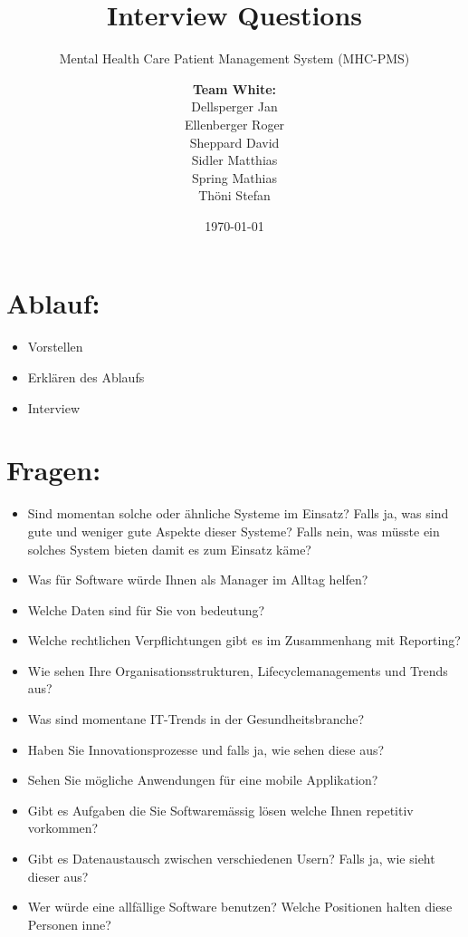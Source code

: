 \documentclass[a4paper]{scrartcl}
\title{Interview Questions}
\subtitle{Mental Health Care Patient Management System (MHC-PMS)}
\author{
\begin{tabular}{l}
\normalfont\bfseries{Team White:}\\
Dellsperger Jan\\
Ellenberger Roger\\
Sheppard David\\
Sidler Matthias\\
Spring Mathias\\
Thöni Stefan
\end{tabular}
}
\date{\today}
\begin{document}
\begin{titlepage}
	\maketitle
\end{titlepage}

\section{Ablauf:}
\begin{itemize}
\item Vorstellen
\item Erklären des Ablaufs
\item Interview
\end{itemize}

\section{Fragen:}
\begin{itemize}
\item Sind momentan solche oder ähnliche Systeme im Einsatz? Falls ja, was sind gute und weniger gute Aspekte dieser Systeme? Falls nein, was müsste ein solches System bieten damit es zum Einsatz käme?
\item Was für Software würde Ihnen als Manager im Alltag helfen?
\item Welche Daten sind für Sie von bedeutung?
\item Welche rechtlichen Verpflichtungen gibt es im Zusammenhang mit Reporting?
\item Wie sehen Ihre Organisationsstrukturen, Lifecyclemanagements und Trends aus?
\item Was sind momentane IT-Trends in der Gesundheitsbranche?
\item Haben Sie Innovationsprozesse und falls ja, wie sehen diese aus?
\item Sehen Sie mögliche Anwendungen für eine mobile Applikation?
\item Gibt es Aufgaben die Sie Softwaremässig lösen welche Ihnen repetitiv vorkommen?
\item Gibt es Datenaustausch zwischen verschiedenen Usern? Falls ja, wie sieht dieser aus?
\item Wer würde eine allfällige Software benutzen? Welche Positionen halten diese Personen inne?
\end{itemize}
\end{document}
